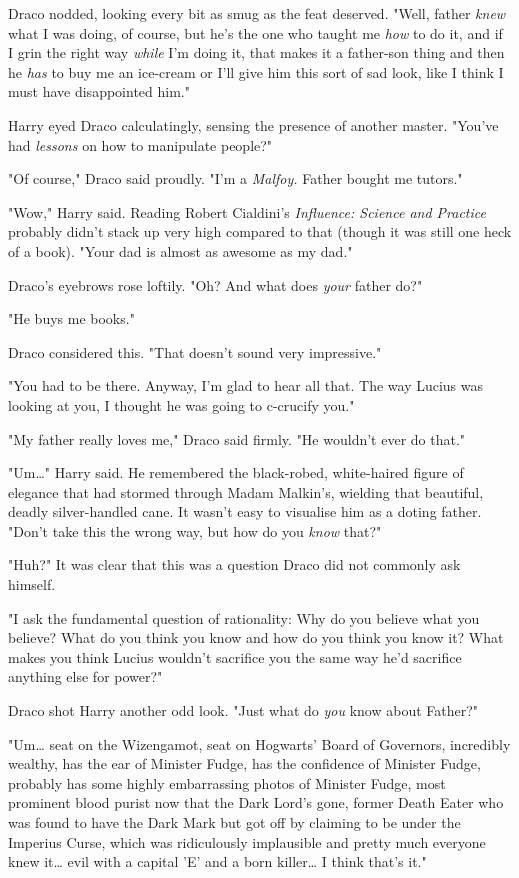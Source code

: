 Draco nodded, looking every bit as smug as the feat deserved. "Well, father 
\emph{knew} what I was doing, of course, but he's the one who taught me 
\emph{how} to do it, and if I grin the right way \emph{while} I'm doing it, 
that makes it a father-son thing and then he \emph{has} to buy me an ice-cream 
or I'll give him this sort of sad look, like I think I must have disappointed 
him."

Harry eyed Draco calculatingly, sensing the presence of another master. "You've 
had \emph{lessons} on how to manipulate people?"

"Of course," Draco said proudly. "I'm a \emph{Malfoy.} Father bought me tutors."

"Wow," Harry said. Reading Robert Cialdini's \emph{Influence: Science and 
Practice} probably didn't stack up very high compared to that (though it was 
still one heck of a book). "Your dad is almost as awesome as my dad."

Draco's eyebrows rose loftily. "Oh? And what does \emph{your} father do?"

"He buys me books."

Draco considered this. "That doesn't sound very impressive."

"You had to be there. Anyway, I'm glad to hear all that. The way Lucius was 
looking at you, I thought he was going to c-crucify you."

"My father really loves me," Draco said firmly. "He wouldn't ever do that."

"Um{\ldots}" Harry said. He remembered the black-robed, white-haired figure of 
elegance that had stormed through Madam Malkin's, wielding that beautiful, 
deadly silver-handled cane. It wasn't easy to visualise him as a doting father. 
"Don't take this the wrong way, but how do you \emph{know} that?"

"Huh?" It was clear that this was a question Draco did not commonly ask himself.

"I ask the fundamental question of rationality: Why do you believe what you 
believe? What do you think you know and how do you think you know it? What 
makes you think Lucius wouldn't sacrifice you the same way he'd sacrifice 
anything else for power?"

Draco shot Harry another odd look. "Just what do \emph{you} know about Father?"

"Um{\ldots} seat on the Wizengamot, seat on Hogwarts' Board of Governors, 
incredibly wealthy, has the ear of Minister Fudge, has the confidence of 
Minister Fudge, probably has some highly embarrassing photos of Minister Fudge, 
most prominent blood purist now that the Dark Lord's gone, former Death Eater 
who was found to have the Dark Mark but got off by claiming to be under the 
Imperius Curse, which was ridiculously implausible and pretty much everyone 
knew it{\ldots} evil with a capital 'E' and a born killer{\ldots} I think 
that's it."

